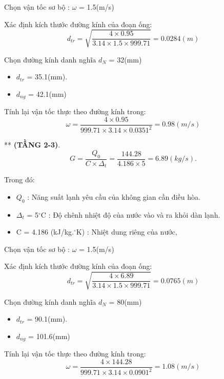 Chọn vận tốc sơ bộ : $\omega$ = 1.5(m/s)

Xác định kích thước đường kính của đoạn ống:
\begin{equation*}
	d_{tr} = \sqrt{\dfrac{4 \times 0.95}{3.14 \times 1.5 \times 999.71}} = 0.0284(m)
\end{equation*}

Chọn đường kính danh nghĩa $d_{N}$ = 32(mm)
\begin{itemize}
	\item $d_{tr}$ = 35.1(mm).
	\item $d_{ng}$ = 42.1(mm)
\end{itemize}

Tính lại vận tốc thực theo đường kính trong:
\begin{equation*}
	\omega = \dfrac{4 \times 0.95 }{999.71 \times 3.14 \times 0.0351^{2}} = 0.98(m/s)
\end{equation*}

**\textbf{ (TẦNG 2-3)}.
\begin{equation*}
	G = \dfrac{Q_{0}}{C \times \Delta_{t}} =\dfrac{144.28}{4.186 \times 5} = 6.89(kg/s).
\end{equation*}

Trong đó:
\begin{itemize}
	\item $Q_{0}$ : Năng suất lạnh yêu cầu của không gian cần điều hòa.
	\item $\Delta_{t}$ = 5$^{\circ}$C : Độ chênh nhiệt độ của nước vào và ra khỏi dàn lạnh.
	\item C = 4.186 (kJ/kg.$^{\circ}$K) : Nhiệt dung riêng của nước,
\end{itemize}

Chọn vận tốc sơ bộ : $\omega$ = 1.5(m/s)

Xác định kích thước đường kính của đoạn ống:
\begin{equation*}
	d_{tr} = \sqrt{\dfrac{4 \times 6.89}{3.14 \times 1.5 \times 999.71}} = 0.0765(m)
\end{equation*}

Chọn đường kính danh nghĩa $d_{N}$ = 80(mm)
\begin{itemize}
	\item $d_{tr}$ = 90.1(mm).
	\item $d_{ng}$ = 101.6(mm)
\end{itemize}

Tính lại vận tốc thực theo đường kính trong:
\begin{equation*}
	\omega = \dfrac{4 \times 144.28 }{999.71 \times 3.14 \times 0.0901^{2}} = 1.08(m/s)
\end{equation*}


